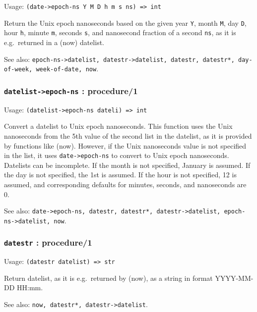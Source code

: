 \documentclass[
]{article}
\newcommand{\passthrough}[1]{#1}
\begin{document}
Usage: \passthrough{\lstinline!(date->epoch-ns Y M D h m s ns) => int!}

Return the Unix epoch nanoseconds based on the given year
\passthrough{\lstinline!Y!}, month \passthrough{\lstinline!M!}, day
\passthrough{\lstinline!D!}, hour \passthrough{\lstinline!h!}, minute
\passthrough{\lstinline!m!}, seconds \passthrough{\lstinline!s!}, and
nanosecond fraction of a second \passthrough{\lstinline!ns!}, as it is
e.g.~returned in a (now) datelist.

See also:
\passthrough{\lstinline!epoch-ns->datelist, datestr->datelist, datestr, datestr*, day-of-week, week-of-date, now!}.

\hypertarget{datelist-epoch-ns-procedure1}{%
\subsubsection{\texorpdfstring{\texttt{datelist-\textgreater{}epoch-ns}
:
procedure/1}{datelist-\textgreater epoch-ns : procedure/1}}\label{datelist-epoch-ns-procedure1}}

Usage: \passthrough{\lstinline!(datelist->epoch-ns dateli) => int!}

Convert a datelist to Unix epoch nanoseconds. This function uses the
Unix nanoseconds from the 5th value of the second list in the datelist,
as it is provided by functions like (now). However, if the Unix
nanoseconds value is not specified in the list, it uses
\passthrough{\lstinline!date->epoch-ns!} to convert to Unix epoch
nanoseconds. Datelists can be incomplete. If the month is not specified,
January is assumed. If the day is not specified, the 1st is assumed. If
the hour is not specified, 12 is assumed, and corresponding defaults for
minutes, seconds, and nanoseconds are 0.

See also:
\passthrough{\lstinline!date->epoch-ns, datestr, datestr*, datestr->datelist, epoch-ns->datelist, now!}.

\hypertarget{datestr-procedure1}{%
\subsubsection{\texorpdfstring{\texttt{datestr} :
procedure/1}{datestr : procedure/1}}\label{datestr-procedure1}}

Usage: \passthrough{\lstinline!(datestr datelist) => str!}

Return datelist, as it is e.g.~returned by (now), as a string in format
YYYY-MM-DD HH:mm.

See also: \passthrough{\lstinline!now, datestr*, datestr->datelist!}.
\end{document}
